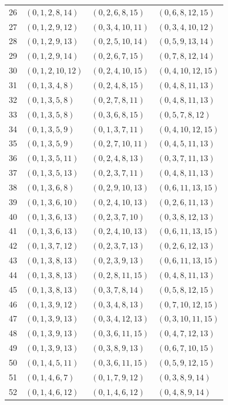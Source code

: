 \begin{longtable}{rlll}
26 & $(0,1,2,8,14)$ & $(0,2,6,8,15)$ & $(0,6,8,12,15)$ \\
27 & $(0,1,2,9,12)$ & $(0,3,4,10,11)$ & $(0,3,4,10,12)$ \\
28 & $(0,1,2,9,13)$ & $(0,2,5,10,14)$ & $(0,5,9,13,14)$ \\
29 & $(0,1,2,9,14)$ & $(0,2,6,7,15)$ & $(0,7,8,12,14)$ \\
30 & $(0,1,2,10,12)$ & $(0,2,4,10,15)$ & $(0,4,10,12,15)$ \\
31 & $(0,1,3,4,8)$ & $(0,2,4,8,15)$ & $(0,4,8,11,13)$ \\
32 & $(0,1,3,5,8)$ & $(0,2,7,8,11)$ & $(0,4,8,11,13)$ \\
33 & $(0,1,3,5,8)$ & $(0,3,6,8,15)$ & $(0,5,7,8,12)$ \\
34 & $(0,1,3,5,9)$ & $(0,1,3,7,11)$ & $(0,4,10,12,15)$ \\
35 & $(0,1,3,5,9)$ & $(0,2,7,10,11)$ & $(0,4,5,11,13)$ \\
36 & $(0,1,3,5,11)$ & $(0,2,4,8,13)$ & $(0,3,7,11,13)$ \\
37 & $(0,1,3,5,13)$ & $(0,2,3,7,11)$ & $(0,4,8,11,13)$ \\
38 & $(0,1,3,6,8)$ & $(0,2,9,10,13)$ & $(0,6,11,13,15)$ \\
39 & $(0,1,3,6,10)$ & $(0,2,4,10,13)$ & $(0,2,6,11,13)$ \\
40 & $(0,1,3,6,13)$ & $(0,2,3,7,10)$ & $(0,3,8,12,13)$ \\
41 & $(0,1,3,6,13)$ & $(0,2,4,10,13)$ & $(0,6,11,13,15)$ \\
42 & $(0,1,3,7,12)$ & $(0,2,3,7,13)$ & $(0,2,6,12,13)$ \\
43 & $(0,1,3,8,13)$ & $(0,2,3,9,13)$ & $(0,6,11,13,15)$ \\
44 & $(0,1,3,8,13)$ & $(0,2,8,11,15)$ & $(0,4,8,11,13)$ \\
45 & $(0,1,3,8,13)$ & $(0,3,7,8,14)$ & $(0,5,8,12,15)$ \\
46 & $(0,1,3,9,12)$ & $(0,3,4,8,13)$ & $(0,7,10,12,15)$ \\
47 & $(0,1,3,9,13)$ & $(0,3,4,12,13)$ & $(0,3,10,11,15)$ \\
48 & $(0,1,3,9,13)$ & $(0,3,6,11,15)$ & $(0,4,7,12,13)$ \\
49 & $(0,1,3,9,13)$ & $(0,3,8,9,13)$ & $(0,6,7,10,15)$ \\
50 & $(0,1,4,5,11)$ & $(0,3,6,11,15)$ & $(0,5,9,12,15)$ \\
51 & $(0,1,4,6,7)$ & $(0,1,7,9,12)$ & $(0,3,8,9,14)$ \\
52 & $(0,1,4,6,12)$ & $(0,1,4,6,12)$ & $(0,4,8,9,14)$ \\

\end{longtable}
